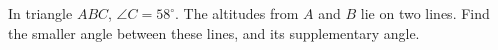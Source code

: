 In triangle $ABC$, $\angle C=58^\circ$. The altitudes from $A$ and $B$ lie on two lines. Find the smaller angle between these lines, and its supplementary angle.
